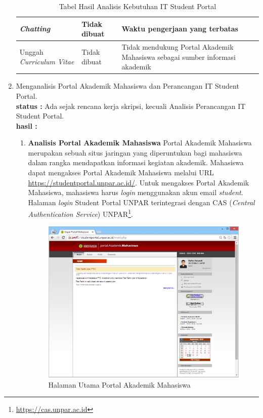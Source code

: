 \documentclass[a4paper,twoside]{article}
\begin{document}
\begin{enumerate}
\begin{table}[H]
\begin{tabular}{|p{4.5cm}|p{2.5cm}|p{8cm}|}
		\hline
    \textit{Chatting}                                          & Tidak dibuat & Waktu pengerjaan yang terbatas                                                                        \\
		\hline
    Unggah \textit{Curriculum Vitae}                           & Tidak dibuat & Tidak mendukung Portal Akademik Mahasiswa sebagai sumber informasi akademik                           \\
		\hline
		\end{tabular}
		\caption{Tabel Hasil Analisis Kebutuhan IT Student Portal}
	\label{tab:3_hasil_fitur}
\end{table}
		
		\item Menganalisis Portal Akademik Mahasiswa dan Perancangan IT Student Portal.\\
		{\bf status :} Ada sejak rencana kerja skripsi, kecuali Analisis Perancangan IT Student Portal.\\
		{\bf hasil :} \\
		\begin{enumerate}

		\item\textbf{Analisis Portal Akademik Mahasiswa}
Portal Akademik Mahasiswa merupakan sebuah situs jaringan yang diperuntukan bagi mahasiswa dalam rangka mendapatkan informasi kegiatan akademik\cite{BTI:2012}. Mahasiswa dapat mengakses Portal Akademik Mahasiswa melalui URL \url{https://studentportal.unpar.ac.id/}. Untuk mengakses Portal Akademik Mahasiswa, mahasiswa harus \textit{login} menggunakan akun email \textit{student}. Halaman \textit{login} Student Portal UNPAR terintegrasi dengan CAS (\textit{Central Authentication Service}) UNPAR\footnote{\url{https://cas.unpar.ac.id}}.

\begin{figure}[H]
	\centering
	\includegraphics[scale=0.5]{Gambar/pam-home}
	\caption{Halaman Utama Portal Akademik Mahasiswa} 
	\label{fig:3_pam_home}
\end{figure}


\end{enumerate}
\end{enumerate}
\end{document}

